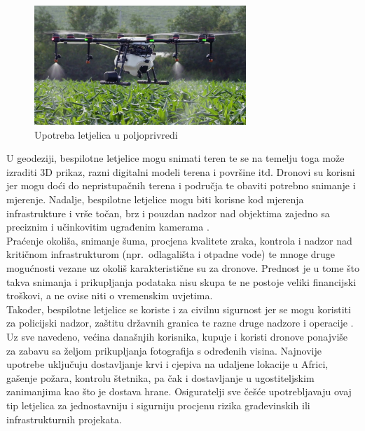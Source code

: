 \documentclass[times, utf8, diplomski]{fer}
\begin{document}
\begin{figure}[htb]
\centering
\includegraphics[width=8cm]{img/poljoprivreda.png}
\caption{Upotreba letjelica u poljoprivredi\protect\footnotemark}
\label{fig:letjelicaUPoljoprivredi}
\end{figure}
U geodeziji, bespilotne letjelice mogu snimati teren te se na temelju toga može izraditi 3D prikaz, razni digitalni modeli terena i površine itd. Dronovi su korisni jer mogu doći do nepristupačnih terena i područja te obaviti potrebno snimanje  i mjerenje.  Nadalje,  bespilotne letjelice  mogu  biti korisne kod mjerenja infrastrukture i vrše točan, brz i pouzdan nadzor nad objektima zajedno sa preciznim i učinkovitim ugrađenim kamerama \citep{GeoTron}.\\
Praćenje  okoliša,  snimanje  šuma,  procjena  kvalitete  zraka,  kontrola   i nadzor nad kritičnom infrastrukturom (npr.~odlagališta  i otpadne  vode)  te  mnoge  druge  mogućnosti  vezane  uz  okoliš  karakteristične  su za  dronove. Prednost je u tome što takva snimanja i prikupljanja podataka nisu skupa te ne postoje veliki financijski troškovi, a ne ovise niti o vremenskim uvjetima.\\
Također, bespilotne letjelice se koriste i za civilnu sigurnost jer se mogu koristiti za policijski nadzor, zaštitu državnih granica te razne druge nadzore i operacije \citep{GeoTron}. Uz sve navedeno, većina današnjih korisnika, kupuje i koristi dronove ponajviše za zabavu sa željom prikupljanja fotografija s određenih visina. 
Najnovije upotrebe uključuju dostavljanje krvi i cjepiva na udaljene lokacije u Africi, gašenje požara, kontrolu štetnika, pa čak i dostavljanje u ugostiteljskim zanimanjima kao što je dostava hrane.
Osiguratelji  sve  češće  upotrebljavaju ovaj  tip  letjelica za  jednostavniju  i  sigurniju procjenu rizika građevinskih ili infrastrukturnih projekata.
\end{document}
